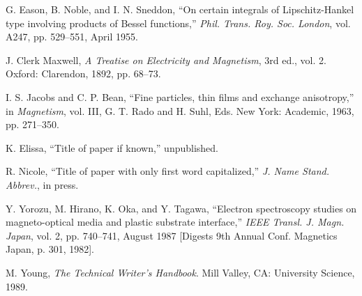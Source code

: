 
\begin{thebibliography}{00}
 G. Eason, B. Noble, and I. N. Sneddon, ``On certain integrals of Lipschitz-Hankel type involving products of Bessel functions,'' \textit{Phil. Trans. Roy. Soc. London}, vol. A247, pp. 529--551, April 1955.

 J. Clerk Maxwell, \textit{A Treatise on Electricity and Magnetism}, 3rd ed., vol. 2. Oxford: Clarendon, 1892, pp. 68--73.

 I. S. Jacobs and C. P. Bean, ``Fine particles, thin films and exchange anisotropy,'' in \textit{Magnetism}, vol. III, G. T. Rado and H. Suhl, Eds. New York: Academic, 1963, pp. 271--350.

 K. Elissa, ``Title of paper if known,'' unpublished.

 R. Nicole, ``Title of paper with only first word capitalized,'' \textit{J. Name Stand. Abbrev.}, in press.

 Y. Yorozu, M. Hirano, K. Oka, and Y. Tagawa, ``Electron spectroscopy studies on magneto-optical media and plastic substrate interface,'' \textit{IEEE Transl. J. Magn. Japan}, vol. 2, pp. 740--741, August 1987 [Digests 9th Annual Conf. Magnetics Japan, p. 301, 1982].

 M. Young, \textit{The Technical Writer's Handbook}. Mill Valley, CA: University Science, 1989.
\end{thebibliography}

